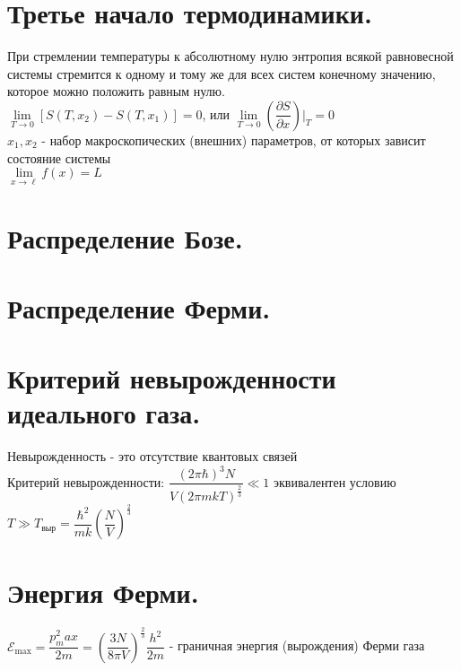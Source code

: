 \begin{multicols*}{2}
		\section{Третье начало термодинамики.}
		При стремлении температуры к абсолютному  нулю энтропия всякой равновесной системы стремится к одному и тому же для всех систем конечному значению, которое можно положить равным нулю.\\
		$\lim\limits_{T\to 0} [ S(T, x_2) - S(T, x_1)] =0$, или $\lim\limits_{T\to 0} (\dfrac{\partial S}{\partial x})\vert _T = 0$\\
		$x_1, x_2$ - набор макроскопических (внешних) параметров, от которых зависит состояние системы\\
		$\lim\limits_{x \to \ell }f(x)=L$

		\section{Распределение Бозе.}

		\section{Распределение Ферми.}

		\section{Критерий невырожденности идеального газа.}
		Невырожденность - это отсутствие квантовых связей\\
		Критерий невырожденности: $\dfrac{(2\pi \hbar)^3 N}{V(2\pi mkT)^{\frac{2}{3}}} \ll 1$ \Rightarrow эквивалентен условию $T\gg T_{\text{выр}} = \dfrac{\hbar^2}{mk} \left(\dfrac{N}{V}\right)^{\frac{2}{3}}$

		\section{Энергия Ферми.}
		${\mathcal{E}}_{\text{max}} = \dfrac{p^2_max}{2m} = \left(\dfrac{3N}{8\pi V}\right)^{\frac{2}{3}}\dfrac{h^2}{2m}$ - граничная энергия (вырождения) Ферми газа
	\end{multicols*}

